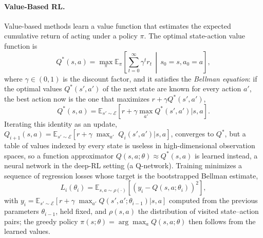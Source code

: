 \paragraph{Value-Based RL.}
Value-based methods learn a value function that estimates the expected cumulative return of acting under a policy $\pi$.
The optimal state-action value function is
\begin{equation}
Q^*(s,a) = \max_\pi \mathbb{E}_\pi \left[ \sum_{t=0}^{\infty} \gamma^t r_t \,\middle|\, s_0 = s, a_0 = a \right],
\end{equation}
where $\gamma \in (0,1)$ is the discount factor, and it satisfies the \textit{Bellman equation}: if the optimal values $Q^*(s',a')$ of the next state are known for every action $a'$, the best action now is the one that maximizes $r+\gamma Q^*(s',a')$,
\begin{equation}
    Q^*(s, a) = \mathbb{E}_{s' \sim \mathcal{E}} [r+\gamma \max_{a'} Q^{*}(s', a') | s, a].
\end{equation}
Iterating this identity as an update, $Q_{i+1}(s, a) = \mathbb{E}_{s' \sim \mathcal{E} }[r+\gamma\; \max_{a'} \; Q_{i}(s', a') | s, a]$, converges to $Q^*$, but a table of values indexed by every state is useless in high-dimensional observation spaces, so a function approximator $Q(s,a;\theta)\approx Q^*(s,a)$ is learned instead, a neural network in the deep-RL setting (a Q-network).
Training minimizes a sequence of regression losses whose target is the bootstrapped Bellman estimate,
\begin{equation}
    L_i(\theta_i) = \mathbb{E}_{s, a \sim \rho(\cdot)} [(y_i - Q(s, a; \theta_i))^{2}],
\end{equation}
with $y_i = \mathbb{E}_{s' \sim \mathcal{E}} [r + \gamma \; \max_{a'} Q(s', a';\theta_{i-1}) | s, a]$ computed from the previous parameters $\theta_{i-1}$, held fixed, and $\rho(s,a)$ the distribution of visited state--action pairs; the greedy policy $\pi(s;\theta) = \arg\max_{a} Q(s, a;\theta)$ then follows from the learned values.

